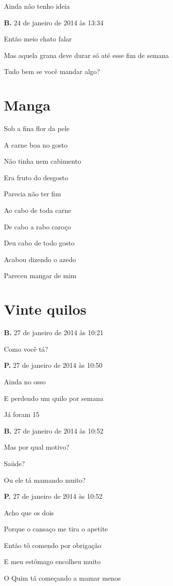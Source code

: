 {{Ainda não tenho ideia

\textbf{B.} 24 de janeiro de 2014 às 13:34

Então meio chato falar

Mas aquela grana deve durar só até esse fim de semana

Tudo bem se você mandar algo?


\chapter{Manga}\label{manga}

Sob a fina flor da pele

A carne boa no gosto

Não tinha nem cabimento

Era fruto do desgosto

Parecia não ter fim

Ao cabo de toda carne

De cabo a rabo caroço

 Deu cabo de todo gosto

Acabou dizendo o azedo

Pareceu mangar de mim




\chapter{Vinte quilos}

\textbf{B.} 27 de janeiro de 2014 às 10:21

Como você tá?

\textbf{P.} 27 de janeiro de 2014 às 10:50

Ainda no osso

E perdendo um quilo por semana

Já foram 15

\textbf{B.} 27 de janeiro de 2014 às 10:52

Mas por qual motivo?

Saúde?

Ou ele tá mamando muito?

\textbf{P.} 27 de janeiro de 2014 às 10:52

Acho que os dois

Porque o cansaço me tira o apetite

Então tô comendo por obrigação

E meu estômago encolheu muito

O Quim tá começando a mamar menos

}}
